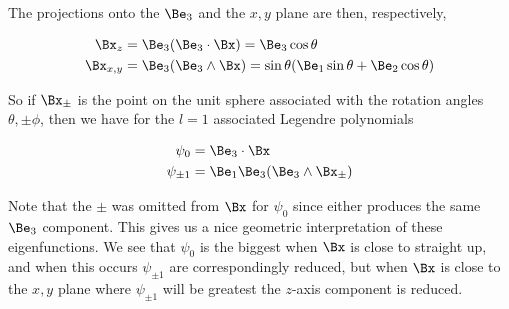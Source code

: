 The projections onto the $\Be_3$ and the $x,y$ plane are then, respectively,

\begin{align}\label{eqn:foob5}
\Bx_z &= \Be_3 (\Be_3 \cdot \Bx) = \Be_3 \cos\theta  \\
\Bx_{x,y} &= \Be_3 (\Be_3 \wedge \Bx) = \sin\theta (\Be_1 \sin\theta + \Be_2 \cos\theta) 
\end{align}

So if $\Bx_{\pm}$ is the point on the unit sphere associated with the rotation angles $\theta,\pm\phi$, then we have for the $l=1$ associated Legendre polynomials

\begin{align}\label{eqn:foob6}
\psi_0 &= \Be_3 \cdot \Bx \\
\psi_{\pm 1} &= \Be_1 \Be_3 (\Be_3 \wedge \Bx_{\pm})
\end{align}

Note that the $\pm$ was omitted from $\Bx$ for $\psi_0$ since either produces the same $\Be_3$ component.  This gives us a nice geometric interpretation of these eigenfunctions.  We see that $\psi_0$ is the biggest when $\Bx$ is close to straight up, and when this occurs $\psi_{\pm 1}$ are correspondingly reduced, but when $\Bx$ is close to the $x,y$ plane where $\psi_{\pm 1}$ will be greatest the $z$-axis component is reduced.

\EndArticle
